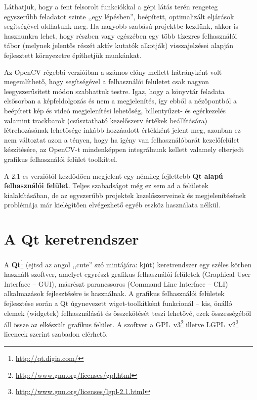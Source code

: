 Láthatjuk, hogy a fent felsorolt funkciókkal a gépi látás terén rengeteg egyszerűbb feladatot szinte ,,egy lépésben'', beépített, optimalizált eljárások segítségével oldhatunk meg. Ha nagyobb szabású projektbe kezdünk, akkor is hasznunkra lehet, hogy részben vagy egészében egy több tízezres felhasználói tábor (melynek jelentős részét aktív kutatók alkotják) visszajelzései alapján fejlesztett környezetre építhetjük munkánkat.

\bigskip

Az OpenCV régebbi verzióiban a számos előny mellett hátrányként volt megemlíthető, hogy segítségével a felhasználói felületet csak nagyon leegyszerűsített módon szabhattuk testre. Igaz, hogy a könyvtár feladata elsősorban a képfeldolgozás és nem a megjelenítés, így ebből a nézőpontból a beépített kép és videó megjelenítési lehetőség, billentyűzet- és egérkezelés valamint trackbarok (csúsztatható kezelőszerv értékek beállítására) létrehozásának lehetősége inkább hozzáadott értékként jelent meg, azonban ez nem változtat azon a tényen, hogy ha igény van felhasználóbarát kezelőfelület készítésére, az OpenCV-t mindenképpen integrálnunk kellett valamely elterjedt grafikus felhasználói felület toolkittel.

A 2.1-es verziótól kezdődően megjelent egy némileg fejlettebb \textbf{Qt alapú felhasználói felület}. Teljes szabadságot még ez sem ad a felületek kialakításában, de az egyszerűbb projektek kezelőszerveinek és megjelenítésének problémája már kielégítően elvégezhető egyéb eszköz használata nélkül.

\section{A Qt keretrendszer}\label{sect:qt}

A \textbf{Qt}\footnote{\url{http://qt.digia.com/}} (ejtsd az angol ,,cute'' szó mintájára: kjút) keretrendszer egy széles körben használt szoftver, amelyet egyrészt grafikus felhasználói felületek (Graphical User Interface -- GUI), másrészt parancssoros (Command Line Interface -- CLI) alkalmazások fejlesztésére is használnak. A grafikus felhasználói felületek fejlesztése során a Qt úgynevezett wiget-toolkitként funkcionál -- kis, önálló elemek (widgetek) felhasználását és összekötését teszi lehetővé, ezek összességéből áll össze az elkészült grafikus felület. A szoftver a  GPL~v3\footnote{\url{http://www.gnu.org/licenses/gpl.html}} illetve LGPL~v2\footnote{\url{http://www.gnu.org/licenses/lgpl-2.1.html}} licencek szerint szabadon elérhető. \cite{qt_wiki}

